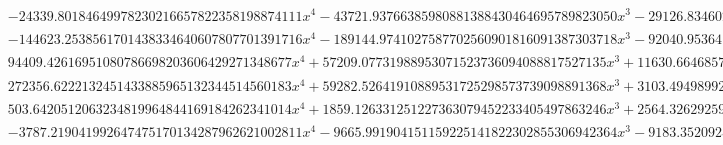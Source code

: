 \documentclass{article}
\begin{document}
\begin{landscape}
\begin{eqnarray*}
\begin{array}{cc}
\begin{array}{cc}
 -24339.80184649978230216657822358198874111 x^4-43721.93766385980881388430464695789823050 x^3-29126.83460254909457283402895580699429817 x^2-8525.681446484948558893006238444461604018 x-925.2100635562852150304478306198391648827 & x\geq -\frac{1}{2}\land x<-\frac{3}{8} \\
 -144623.2538561701438334640607807701391716 x^4-189144.9741027587702560901816091387303718 x^3-92040.95364111216102666011924051064209142 x^2-19733.21788603659092634003233545903437077 x-1570.878926583109625791233332993838725056 & x\geq -\frac{3}{8}\land x<-\frac{1}{4} \\
 94409.42616951080786698203606429271348677 x^4+57209.07731988953071523736094088817527135 x^3+11630.66468579381436587868923866792208929 x^2+850.7491372748998190833387288166312026423 x+11.19733094170308362805918966956103947925 & x\geq -\frac{1}{4}\land x<-\frac{1}{8} \\
 272356.6222132451433885965132344514560183 x^4+59282.52641910889531725298573739098891368 x^3+3103.494989929232689538355586615911587933 x^2+11.97625587452118054138600635942436384494 x+0.1933128773378359832379203910216198576768 & x\geq -\frac{1}{8}\land x<0 \\
 503.6420512063234819964844169184262341014 x^4+1859.126331251227363079452233405497863246 x^3+2564.326292591008366629842659831296252615 x^2+1565.841796253628572007266287119803851900 x+356.9997837075240864603914437755792284287 & x\geq -1\land x<-\frac{3}{4} \\
 -3787.219041992647475170134287962621002811 x^4-9665.991904151159225141822302855306942364 x^3-9183.352092598307327169702171461854545905 x^2-3847.866854062081091287319244366581448705 x-599.7166001506630207381534826305705979192 & x\geq -\frac{3}{4}\land x<-\frac{1}{2}
\end{array}


\end{array}
\end{eqnarray*}
\end{landscape}
\end{document}
